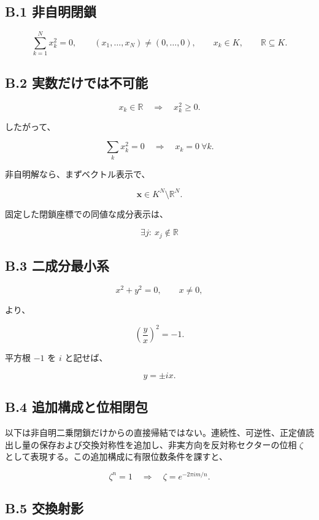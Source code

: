 \documentclass[
  a4paper,
  10pt]{article}
\begin{document}
\subsection{B.1 非自明閉鎖}\label{b1-ux975eux81eaux660eux9589ux9396}

\[
\sum_{k=1}^{N}x_k^2=0,
\qquad
(x_1,\ldots,x_N)\neq(0,\ldots,0),
\qquad
x_k\in K,
\qquad
\mathbb R\subseteq K.
\]

\subsection{B.2
実数だけでは不可能}\label{b2-ux5b9fux6570ux3060ux3051ux3067ux306fux4e0dux53efux80fd}

\[
x_k\in\mathbb R
\quad\Longrightarrow\quad
x_k^2\ge0.
\]

したがって、

\[
\sum_kx_k^2=0
\quad\Longrightarrow\quad
x_k=0\ \forall k.
\]

非自明解なら、まずベクトル表示で、

\[
\mathbf{x}\in K^N\setminus\mathbb R^N.
\]

固定した閉鎖座標での同値な成分表示は、

\[
\exists j:\ x_j\notin\mathbb R
\]

\subsection{B.3
二成分最小系}\label{b3-ux4e8cux6210ux5206ux6700ux5c0fux7cfb}

\[
x^2+y^2=0,
\qquad x\neq0,
\]

より、

\[
\left(\frac{y}{x}\right)^2=-1.
\]

平方根 \(-1\) を \(i\) と記せば、

\[
y=\pm ix.
\]

\subsection{B.4
追加構成と位相閉包}\label{b4-ux8ffdux52a0ux69cbux6210ux3068ux4f4dux76f8ux9589ux5305}

以下は非自明二乗閉鎖だけからの直接帰結ではない。連続性、可逆性、正定値読出し量の保存および交換対称性を追加し、非実方向を反対称セクターの位相
\(\zeta\) として表現する。この追加構成に有限位数条件を課すと、

\[
\zeta^n=1
\quad\Longrightarrow\quad
\zeta=e^{-2\pi im/n}.
\]

\subsection{B.5 交換射影}\label{b5-ux4ea4ux63dbux5c04ux5f71}
\end{document}
